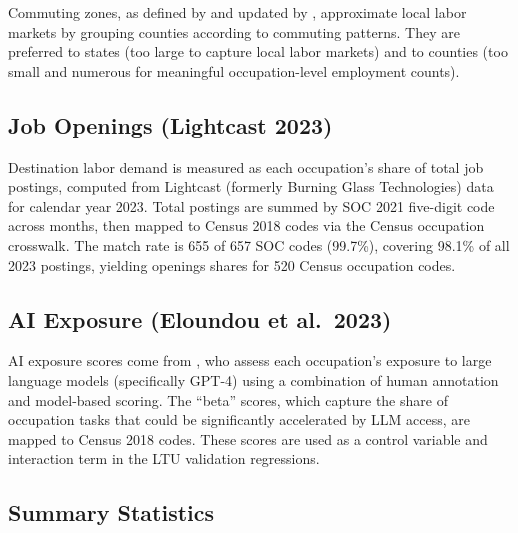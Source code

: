 \documentclass[12pt]{article}
\begin{document}
Commuting zones, as defined by \citet{tolbert1996} and updated by \citet{dorn2009}, approximate local labor markets by grouping counties according to commuting patterns. They are preferred to states (too large to capture local labor markets) and to counties (too small and numerous for meaningful occupation-level employment counts).

\subsection{Job Openings (Lightcast 2023)}
\label{sec:data_openings}

Destination labor demand is measured as each occupation's share of total job postings, computed from Lightcast (formerly Burning Glass Technologies) data for calendar year 2023. Total postings are summed by SOC 2021 five-digit code across months, then mapped to Census 2018 codes via the Census occupation crosswalk. The match rate is 655 of 657 SOC codes (99.7\%), covering 98.1\% of all 2023 postings, yielding openings shares for 520 Census occupation codes.

\subsection{AI Exposure (Eloundou et al.\ 2023)}
\label{sec:data_ai}

AI exposure scores come from \citet{eloundou2023}, who assess each occupation's exposure to large language models (specifically GPT-4) using a combination of human annotation and model-based scoring. The ``beta'' scores, which capture the share of occupation tasks that could be significantly accelerated by LLM access, are mapped to Census 2018 codes. These scores are used as a control variable and interaction term in the LTU validation regressions.

\subsection{Summary Statistics}
\label{sec:data_summary}
\end{document}

